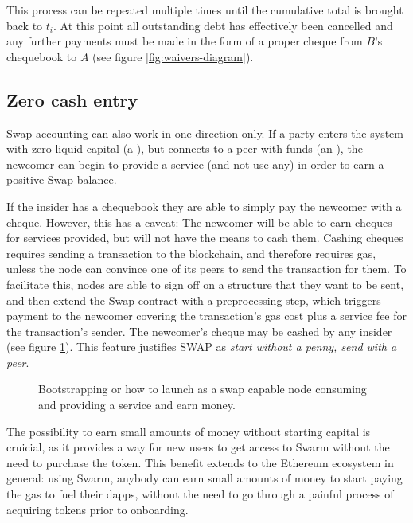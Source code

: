 This process can be repeated multiple times until the cumulative total is brought back to $t_i$. At this point all outstanding debt has effectively been cancelled and any further payments must be made in the form of a proper cheque from $B$'s chequebook to $A$ (see figure \ref{fig:waivers-diagram}).


\subsection{Zero cash entry\statusgreen}\label{sec:zero-cash-entry}


Swap accounting can also work in one direction only. If a party enters the system with zero liquid capital (a ), but connects to a peer with funds (an ), the newcomer can begin to provide a service (and not use any) in order to earn a positive Swap balance. 

If the insider has a chequebook they are able to simply pay the newcomer with a cheque. However, this has a caveat: The newcomer will be able to earn cheques for services provided, but will not have the means to cash them. Cashing cheques requires sending a transaction to the blockchain, and therefore requires gas, unless the node can convince one of its peers to send the transaction for them. To facilitate this, nodes are able to sign off on a structure that they want to be sent, and then extend the Swap contract with a preprocessing step, which triggers payment to the newcomer covering the transaction’s gas cost plus a service fee for the transaction's sender. The newcomer's cheque may be cashed by any insider (see figure \ref{fig:zero-cash-entry}). This feature justifies SWAP as \emph{start without a penny, send with a peer}.

\begin{figure}[htbp]
\centering

\caption[Zero cash entry \statusorange]{Bootstrapping or how to launch as a swap capable node consuming and providing a
service and earn money.}
\label{fig:zero-cash-entry}
\end{figure}

The possibility to earn small amounts of money without starting capital is cruicial, as it provides a way for new users to get access to Swarm without the need to purchase the token. This benefit extends to the Ethereum ecosystem in general: using Swarm, anybody can earn small amounts of money to start paying the gas to fuel their dapps, without the need to go through a painful process of acquiring tokens prior to onboarding. 

